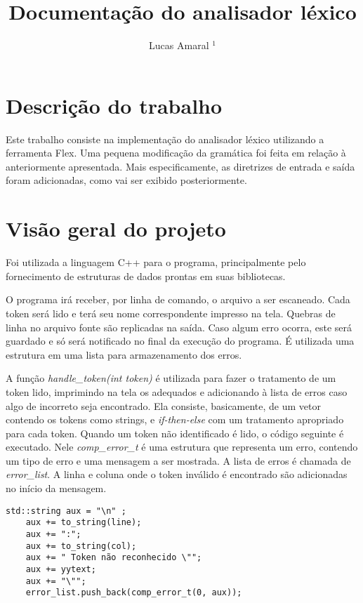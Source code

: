 \documentclass[11pt]{article}
\title{Documentação do analisador léxico}
\author{Lucas Amaral $^1$}
\begin{document}
\maketitle


\section{Descrição do trabalho}

Este trabalho consiste na implementação do analisador léxico utilizando a ferramenta Flex.
Uma pequena modificação da gramática foi feita em relação à anteriormente apresentada. 
Mais especificamente, as diretrizes de entrada e saída foram adicionadas, 
como vai ser exibido posteriormente.

\section{Visão geral do projeto}

Foi utilizada a linguagem C++ para o programa, principalmente pelo fornecimento de estruturas
de dados prontas em suas bibliotecas. 

O programa irá receber, por linha de comando, o arquivo a ser escaneado. Cada token será
lido e terá seu nome correspondente impresso na tela. 
Quebras de linha no arquivo fonte são replicadas na saída. 
Caso algum erro ocorra, este será guardado e só será notificado no final da 
execução do programa. É utilizada uma estrutura em uma lista para armazenamento dos erros.

A função \emph{handle\_token(int token)} é utilizada para fazer o tratamento de um token lido,
imprimindo na tela os adequados e adicionando à lista de erros caso algo de incorreto seja
encontrado. Ela consiste, basicamente, de um vetor contendo os tokens como strings, e \emph{if-then-else} com um tratamento
apropriado para cada token. Quando um token não identificado é lido, o código seguinte é 
executado. Nele \emph{comp\_error\_t} é uma estrutura que representa um erro, contendo um tipo de
erro e uma mensagem a ser mostrada. A lista de erros é chamada de \emph{error\_list}. A linha
e coluna onde o token inválido é encontrado são adicionadas no início da mensagem.


\begin{lstlisting}[basicstyle=\small]
    std::string aux = "\n" ;
    aux += to_string(line);
    aux += ":";
    aux += to_string(col);
    aux += " Token não reconhecido \"";
    aux += yytext;
    aux += "\"";
    error_list.push_back(comp_error_t(0, aux));
\end{lstlisting}
\end{document}
